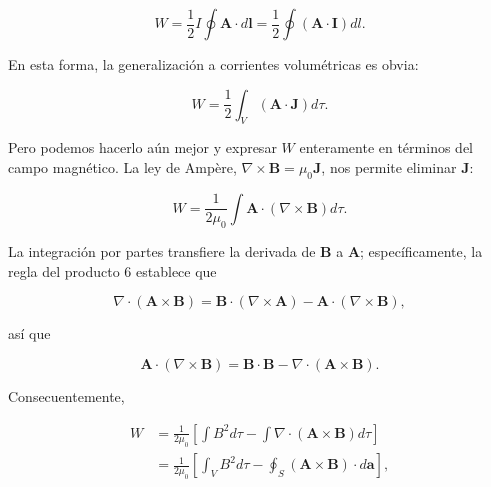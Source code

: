\documentclass[12pt,a4paper]{report}
\newcommand{\esp}{\vspace{0.5cm}}
\begin{document}
	\begin{equation}
		W = \frac{1}{2} I \oint \mathbf{A} \cdot d\mathbf{l} = \frac{1}{2} \oint (\mathbf{A} \cdot \mathbf{I}) dl. \tag{7.31}
	\end{equation}
	
	\esp
	
	En esta forma, la generalización a corrientes volumétricas es obvia:
	
	\esp
	
	\begin{equation}
		W = \frac{1}{2} \int_V (\mathbf{A} \cdot \mathbf{J}) d\tau. \tag{7.32}
	\end{equation}
	
	\esp
	
	Pero podemos hacerlo aún mejor y expresar $W$ enteramente en términos del campo magnético. La ley de Ampère, $\nabla \times \mathbf{B} = \mu_0 \mathbf{J}$, nos permite eliminar $\mathbf{J}$:
	
	\esp
	
	\begin{equation}
		W = \frac{1}{2\mu_0} \int \mathbf{A} \cdot (\nabla \times \mathbf{B}) d\tau. \tag{7.33}
	\end{equation}
	
	\esp
	
	La integración por partes transfiere la derivada de $\mathbf{B}$ a $\mathbf{A}$; específicamente, la regla del producto 6 establece que
	
	\esp
	
	\begin{equation}
		\nabla \cdot (\mathbf{A} \times \mathbf{B}) = \mathbf{B} \cdot (\nabla \times \mathbf{A}) - \mathbf{A} \cdot (\nabla \times \mathbf{B}),
	\end{equation}
	
	\esp
	
	así que
	
	\esp
	
	\begin{equation}
		\mathbf{A} \cdot (\nabla \times \mathbf{B}) = \mathbf{B} \cdot \mathbf{B} - \nabla \cdot (\mathbf{A} \times \mathbf{B}).
	\end{equation}
	
	\esp
	
	Consecuentemente,
	
	\esp
	
	\begin{align}
		W &= \frac{1}{2\mu_0} \left[ \int B^2 d\tau - \int \nabla \cdot (\mathbf{A} \times \mathbf{B}) d\tau \right] \nonumber \\
		&= \frac{1}{2\mu_0} \left[ \int_V B^2 d\tau - \oint_S (\mathbf{A} \times \mathbf{B}) \cdot d\mathbf{a} \right], \tag{7.34}
	\end{align}
	
\end{document}
